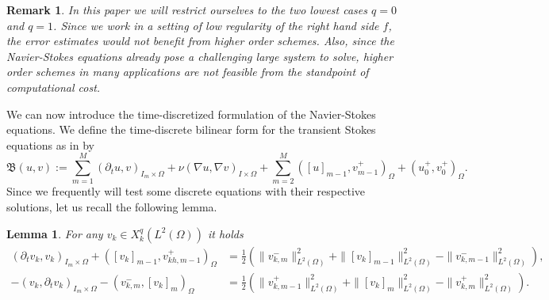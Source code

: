\documentclass{m2an}
\newtheorem{lemma}[theorem]{Lemma}
\newtheorem{remark}[theorem]{Remark}
\newcommand{\IOprod}[1]{\left( #1 \right)_{I\times\Omega}}
\newcommand{\ImOprod}[1]{\left( #1 \right)_{I_m\times\Omega}}
\newcommand{\Oprod}[1]{\left( #1 \right)_{\Omega}}
\newcommand{\vk}{v_{k}}
\begin{document}
\begin{remark}
  In this paper we will restrict ourselves to the two lowest cases $q=0$ and $q=1$.
  Since we work in a setting of low regularity of the right hand side $f$, 
  the error estimates would not benefit from higher order schemes.
  Also, since the Navier-Stokes equations already pose a challenging large system to solve,
  higher order schemes in many applications are not feasible from the standpoint of computational cost.
\end{remark}
We can now introduce the time-discretized formulation of 
the Navier-Stokes equations.
We define the time-discrete bilinear form for the transient Stokes equations as in 
\cite{behringer_fully_2022} by
\begin{equation*}
  \mathfrak B (u,v) := \sum_{m=1}^M \ImOprod{\partial_t u, v} + \nu\IOprod{\nabla u, \nabla v}
  + \sum_{m=2}^M \Oprod{[u]_{m-1},v^+_{m-1}} + \Oprod{u_0^+,v_0^+}.
\end{equation*}
Since we frequently will test some discrete equations with their respective solutions,
let us recall the following lemma.
\begin{lemma}\label{lemm:jump_reorder}
  For any $\vk\in X_k^q(L^2(\Omega))$ it holds
  \begin{align*}
  \ImOprod{\partial_t \vk,\vk} + \Oprod{[\vk]_{m-1},v_{kh,m-1}^+}
  &= \frac{1}{2} \left(\|v_{k,m}^-\|_{L^2(\Omega)}^2  + \|[\vk]_{m-1}\|_{L^2(\Omega)}^2 - \|v_{k,m-1}^-\|_{L^2(\Omega)}^2 \right),\\
  - \ImOprod{\vk, \partial_t \vk} - \Oprod{v_{k,m}^-, [\vk]_{m}}
  &= \frac{1}{2} \left(\|v_{k,m-1}^+\|_{L^2(\Omega)}^2  + \|[\vk]_{m}\|_{L^2(\Omega)}^2 - \|v_{k,m}^+\|_{L^2(\Omega)}^2 \right).
  \end{align*}
\end{lemma}
\end{document}
